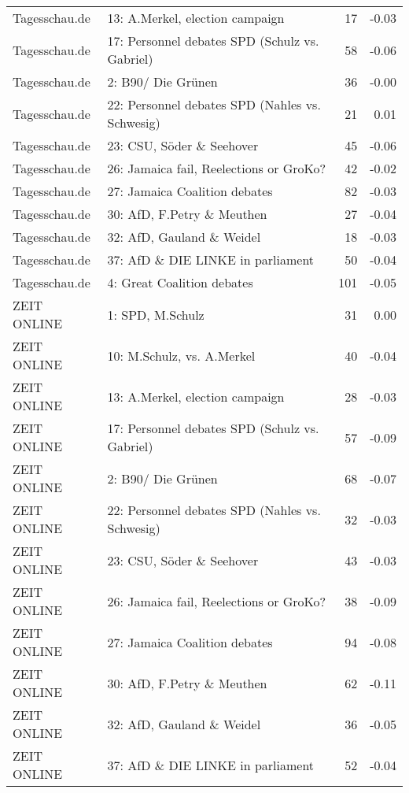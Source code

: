 \begin{table}[ht]
\begin{tabular}{llrr}
  Tagesschau.de & 13: A.Merkel, election campaign &  17 & -0.03 \\ 
  Tagesschau.de & 17: Personnel debates SPD (Schulz vs. Gabriel) &  58 & -0.06 \\ 
  Tagesschau.de & 2: B90/ Die Grünen &  36 & -0.00 \\ 
  Tagesschau.de & 22: Personnel debates SPD (Nahles vs. Schwesig) &  21 & 0.01 \\ 
  Tagesschau.de & 23: CSU, Söder \& Seehover &  45 & -0.06 \\ 
  Tagesschau.de & 26: Jamaica fail, Reelections or GroKo? &  42 & -0.02 \\ 
  Tagesschau.de & 27: Jamaica Coalition debates &  82 & -0.03 \\ 
  Tagesschau.de & 30: AfD, F.Petry \& Meuthen &  27 & -0.04 \\ 
  Tagesschau.de & 32: AfD, Gauland \& Weidel &  18 & -0.03 \\ 
  Tagesschau.de & 37: AfD \& DIE LINKE in parliament &  50 & -0.04 \\ 
  Tagesschau.de & 4: Great Coalition debates & 101 & -0.05 \\ 
  ZEIT ONLINE & 1: SPD, M.Schulz &  31 & 0.00 \\ 
  ZEIT ONLINE & 10: M.Schulz, vs. A.Merkel &  40 & -0.04 \\ 
  ZEIT ONLINE & 13: A.Merkel, election campaign &  28 & -0.03 \\ 
  ZEIT ONLINE & 17: Personnel debates SPD (Schulz vs. Gabriel) &  57 & -0.09 \\ 
  ZEIT ONLINE & 2: B90/ Die Grünen &  68 & -0.07 \\ 
  ZEIT ONLINE & 22: Personnel debates SPD (Nahles vs. Schwesig) &  32 & -0.03 \\ 
  ZEIT ONLINE & 23: CSU, Söder \& Seehover &  43 & -0.03 \\ 
  ZEIT ONLINE & 26: Jamaica fail, Reelections or GroKo? &  38 & -0.09 \\ 
  ZEIT ONLINE & 27: Jamaica Coalition debates &  94 & -0.08 \\ 
  ZEIT ONLINE & 30: AfD, F.Petry \& Meuthen &  62 & -0.11 \\ 
  ZEIT ONLINE & 32: AfD, Gauland \& Weidel &  36 & -0.05 \\ 
  ZEIT ONLINE & 37: AfD \& DIE LINKE in parliament &  52 & -0.04 \\ 
   \hline
\end{tabular}
\end{table}
